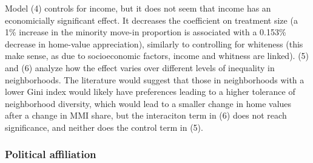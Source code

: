 \documentclass[11pt]{article}
\begin{document}
  Model (4) controls for income, but it does not seem that income has an
  economicially significant effect. It decreases the coefficient on
  treatment size (a 1\% increase in the minority move-in proportion is
  associated with a 0.153\% decrease in home-value appreciation),
  similarly to controlling for whiteness (this make sense, as due to
  socioeconomic factors, income and whitness are linked). (5) and (6)
  analyze how the effect varies over different levels of inequality in
  neighborhoods. The literature would suggest that those in
  neighborhoods with a lower Gini index would likely have preferences
  leading to a higher tolerance of neighborhood diversity, which would
  lead to a smaller change in home values after a change in MMI share,
  but the interaciton term in (6) does not reach significance, and
  neither does the control term in (5).

    \subsubsection{Political affiliation}\label{political-affiliation}
\end{document}

